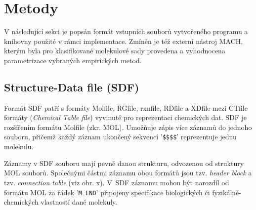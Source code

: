 \chapter{Metody}
V následující sekci je popsán formát vstupních souborů vytvořeného programu a kni\-hov\-ny použité v rámci implementace. Zmíněn je  též externí nástroj MACH, kterým byla pro klasifikované molekulové sady provedena a vyhodnocena parametrizace vybraných empirických metod. 

\section{Structure-Data file (SDF)}
Formát SDF \cite{sdf_pdf, sdf_clanek} patří s formáty Molfile, RGfile, rxnfile, RDfile a XDfile mezi CTfile formáty (\textit{Chemical Table file})  vyvinuté pro reprezentaci chemických dat. SDF je rozšířením formátu Molfile (zkr. MOL). 
Umožňuje zápis více záznamů do jednoho souboru, přičemž každý záznam ukončený sekvencí '\verb|$$$$|' reprezentuje jednu molekulu. 

Záznamy v SDF souboru mají pevně danou strukturu, odvozenou od struktury MOL souborů. Společnými  částmi záznamu obou formátů jsou tzv. \textit{header block} a tzv. \textit{connection table} (viz obr. x). %
V~SDF záznamu mohou být narozdíl od formátu MOL za řádek '\verb|M END|' připojeny specifikace biologických či fyzikálně-che\-mic\-kých vlastností dané molekuly. 

